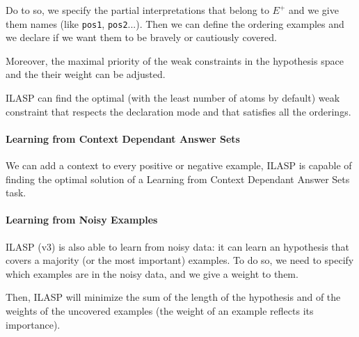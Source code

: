 
\smallskip

Do to so, we specify the partial interpretations that belong to $E^+$ and we give them names (like \texttt{pos1}, \texttt{pos2}...). Then we can define the ordering examples and we declare if we want them to be bravely or cautiously covered. 

\smallskip

Moreover, the maximal priority of the weak constraints in the hypothesis space and the their weight can be adjusted.

\smallskip

ILASP can find the optimal (with the least number of atoms by default) weak constraint that respects the declaration mode and that satisfies all the orderings.

\paragraph{Learning from Context Dependant Answer Sets} 

We can add a context to every positive or negative example, ILASP is capable of finding the optimal solution of a Learning from Context Dependant Answer Sets task.

\paragraph{Learning from Noisy Examples}

ILASP (v3) is also able to learn from noisy data: it can learn an hypothesis that covers a majority (or the most important) examples. To do so, we need to specify which examples are in the noisy data, and we give a weight to them. 

\smallskip

Then, ILASP will minimize the sum of the length of the hypothesis and of the weights of the uncovered examples (the weight of an example reflects its importance).


